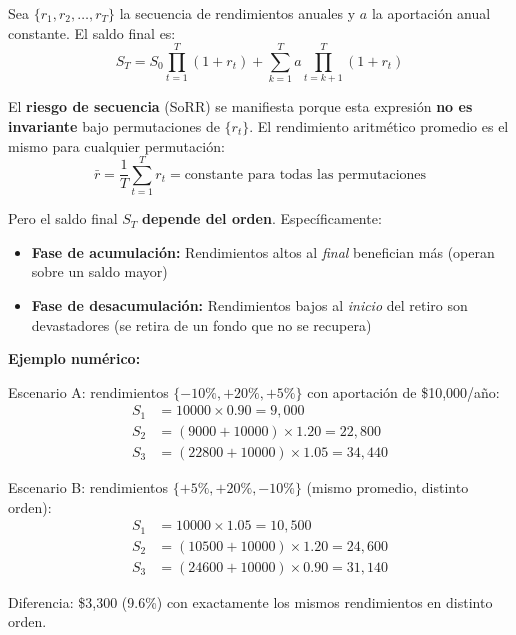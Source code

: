 \documentclass[11pt,a4paper]{report}
\begin{document}
\begin{tcolorbox}[colback=blue!5!white, colframe=blue!75!black, title=\textbf{Definici\'on Formal: Sequence of Returns Risk}, breakable]
Sea $\{r_1, r_2, \ldots, r_T\}$ la secuencia de rendimientos anuales y $a$ la aportaci\'on anual constante. El saldo final es:
\[
  S_T = S_0 \prod_{t=1}^T (1+r_t) + \sum_{k=1}^T a \prod_{t=k+1}^T (1+r_t)
\]

El \textbf{riesgo de secuencia} (SoRR) se manifiesta porque esta expresi\'on \textbf{no es invariante} bajo permutaciones de $\{r_t\}$. El rendimiento aritm\'etico promedio es el mismo para cualquier permutaci\'on:
\[
  \bar{r} = \frac{1}{T}\sum_{t=1}^T r_t = \text{constante para todas las permutaciones}
\]

Pero el saldo final $S_T$ \textbf{depende del orden}. Espec\'ificamente:
\begin{itemize}
  \item \textbf{Fase de acumulaci\'on:} Rendimientos altos al \textit{final} benefician m\'as (operan sobre un saldo mayor)
  \item \textbf{Fase de desacumulaci\'on:} Rendimientos bajos al \textit{inicio} del retiro son devastadores (se retira de un fondo que no se recupera)
\end{itemize}

\textbf{Ejemplo num\'erico:}

Escenario A: rendimientos $\{-10\%, +20\%, +5\%\}$ con aportaci\'on de \$10,000/a\~no:
\begin{align*}
  S_1 &= 10000 \times 0.90 = 9,000 \\
  S_2 &= (9000 + 10000) \times 1.20 = 22,800 \\
  S_3 &= (22800 + 10000) \times 1.05 = 34,440
\end{align*}

Escenario B: rendimientos $\{+5\%, +20\%, -10\%\}$ (mismo promedio, distinto orden):
\begin{align*}
  S_1 &= 10000 \times 1.05 = 10,500 \\
  S_2 &= (10500 + 10000) \times 1.20 = 24,600 \\
  S_3 &= (24600 + 10000) \times 0.90 = 31,140
\end{align*}

Diferencia: \$3,300 (9.6\%) con exactamente los mismos rendimientos en distinto orden.
\end{tcolorbox}
\end{document}
